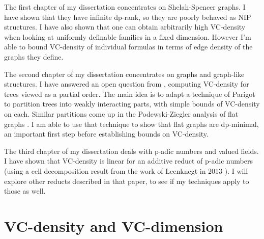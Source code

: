 The first chapter of my dissertation concentrates on Shelah-Spencer graphs. I have shown that they have infinite dp-rank, so they are poorly behaved as NIP structures. I have also shown that one can obtain arbitrarily high VC-density when looking at uniformly definable families in a fixed dimension. However I'm able to bound VC-density of individual formulas in terms of edge density of the graphs they define.

The second chapter of my dissertation concentrates on graphs and graph-like structures. I have answered an open question from \cite{density}, computing VC-density for trees viewed as a partial order. The main idea is to adapt a technique of Parigot \cite{parigot_trees} to partition trees into weakly interacting parts, with simple bounds of VC-density on each. Similar partitions come up in the Podewski-Ziegler analysis of flat graphs \cite {stable_graphs}. I am able to use that technique to show that flat graphs are dp-minimal, an important first step before establishing bounds on VC-density. 

The third chapter of my dissertation deals with p-adic numbers and valued fields. I have shown that VC-density is linear for an additive reduct of p-adic numbers (using a cell decomposition result from the work of Leenknegt in 2013 \cite{reduct}). I will explore other reducts described in that paper, to see if my techniques apply to those as well.

\chapter{VC-density and VC-dimension}


